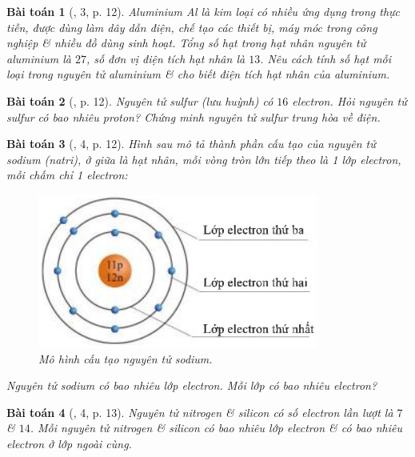 \documentclass{article}
\newtheorem{baitoan}{Bài toán}
\begin{document}
\begin{baitoan}[\cite{SGK_KHTN_7_Canh_Dieu}, 3, p. 12]
	Aluminium \emph{Al} là kim loại có nhiều ứng dụng trong thực tiễn, được dùng làm dây dẫn điện, chế tạo các thiết bị, máy móc trong công nghiệp \& nhiều đồ dùng sinh hoạt. Tổng số hạt trong hạt nhân nguyên tử aluminium là $27$, số đơn vị điện tích hạt nhân là $13$. Nêu cách tính số hạt mỗi loại trong nguyên tử aluminium \& cho biết điện tích hạt nhân của aluminium.
\end{baitoan}

\begin{baitoan}[\cite{SGK_KHTN_7_Canh_Dieu}, p. 12]
	Nguyên tử sulfur (lưu huỳnh) có $16$ electron. Hỏi nguyên tử sulfur có bao nhiêu proton? Chứng minh nguyên tử sulfur trung hòa về điện.
\end{baitoan}

\begin{baitoan}[\cite{SGK_KHTN_7_Canh_Dieu}, 4, p. 12]
	Hình sau mô tả thành phần cấu tạo của nguyên tử sodium (natri), ở giữa là hạt nhân, mỗi vòng tròn lớn tiếp theo là 1 lớp electron, mỗi chấm chỉ 1 electron:
	\begin{figure}[H]
		\centering
		\includegraphics[scale=0.4]{sodium}
		\caption{Mô hình cấu tạo nguyên tử sodium.}
	\end{figure}
	\noindent Nguyên tử sodium có bao nhiêu lớp electron. Mỗi lớp có bao nhiêu electron?
\end{baitoan}

\begin{baitoan}[\cite{SGK_KHTN_7_Canh_Dieu}, 4, p. 13]
	Nguyên tử nitrogen \& silicon có số electron lần lượt là $7$ \& $14$. Mỗi nguyên tử nitrogen \& silicon có bao nhiêu lớp electron \& có bao nhiêu electron ở lớp ngoài cùng.
\end{baitoan}
\end{document}

